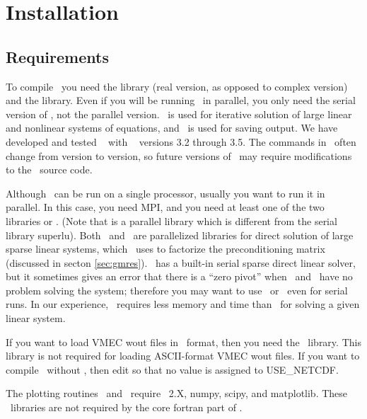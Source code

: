 \chapter{Installation}


\section{Requirements}
\label{sec:requirements}

To compile \sfincs~you need the \href{http://www.mcs.anl.gov/petsc/}{\PETSc} library (real version, as opposed to complex version) 
and the \href{https://www.hdfgroup.org/HDF5/}{\HDF} library.  Even if you will be running \sfincs~in parallel, you
only need the serial version of \HDF, not the parallel version.
\PETSc~is used for iterative solution of large linear and nonlinear systems of equations, and \HDF~is used for saving output.
We have developed and tested \sfincs~ with \PETSc~
versions 3.2 through 3.5.  The commands in \PETSc~often change from version to version, so future versions of \PETSc~may require modifications
to the \sfincs~source code.

Although \sfincs~can be run on a single processor, usually you want to run it in parallel.  
In this case, you need {\ttfamily MPI}, and you need at least one
of the two libraries \href{http://mumps-solver.org/}{\mumps}
or \href{http://crd-legacy.lbl.gov/~xiaoye/SuperLU/}{\superludist}.  (Note that \superludist is a parallel library which is different from the serial library {\ttfamily superlu}).
Both \mumps~and \superludist~are parallelized libraries for direct solution of large sparse linear systems,
which \sfincs~uses to factorize the preconditioning matrix (discussed in secton \ref{sec:gmres}).
\PETSc~has a built-in serial sparse direct linear solver,
but it sometimes gives an error that there is a ``zero pivot'' when \mumps~and \superludist~have no problem solving the system;
therefore you may want to use \mumps~or \superludist~even for serial runs.  In our experience,
\mumps~requires less memory and time than \superludist~for solving a given linear system.

If you want to load {\ttfamily VMEC wout} files in \netCDF~format, then you need the \netCDF~library.
This library is not required for loading ASCII-format {\ttfamily VMEC wout} files.  If you want to compile \sfincs~without
\netCDF, then edit  so that no value is assigned to {\ttfamily USE\_NETCDF}.

The plotting routines \sfincsPlot~and \sfincsScanPlot~require \python~2.X, {\ttfamily numpy}, {\ttfamily scipy}, and {\ttfamily matplotlib}.
These \python~libraries are not required by the core fortran part of \sfincs.

